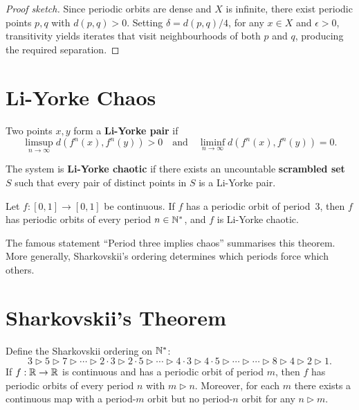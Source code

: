 \begin{proof}[Proof sketch]
Since periodic orbits are dense and $X$ is infinite, there exist periodic
points $p, q$ with $d(p, q) > 0$. Setting $\delta = d(p, q)/4$, for any
$x \in X$ and $\epsilon > 0$, transitivity yields iterates that visit
neighbourhoods of both $p$ and $q$, producing the required separation.
\end{proof}

\section{Li-Yorke Chaos}

\begin{definition}
Two points $x, y$ form a \textbf{Li-Yorke pair} if
\[
    \limsup_{n \to \infty} d(f^n(x), f^n(y)) > 0 \quad \text{and} \quad
    \liminf_{n \to \infty} d(f^n(x), f^n(y)) = 0.
\]
\end{definition}

\begin{definition}
The system is \textbf{Li-Yorke chaotic} if there exists an uncountable
\textbf{scrambled set} $S$ such that every pair of distinct points in $S$ is
a Li-Yorke pair.
\end{definition}

\begin{theorem}[Li-Yorke, 1975]
\label{thm:li-yorke}
Let $f : [0,1] \to [0,1]$ be continuous. If $f$ has a periodic orbit of
period~3, then $f$ has periodic orbits of every period $n \in \mathbb{N}^*$, and $f$
is Li-Yorke chaotic.
\end{theorem}

\begin{remark}
The famous statement ``Period three implies chaos'' summarises this theorem.
More generally, Sharkovskii's ordering determines which periods force which
others.
\end{remark}

\section{Sharkovskii's Theorem}

\begin{theorem}[Sharkovskii, 1964]
Define the Sharkovskii ordering on $\mathbb{N}^*$:
\[
    3 \triangleright 5 \triangleright 7 \triangleright \cdots \triangleright
    2\cdot 3 \triangleright 2\cdot 5 \triangleright \cdots \triangleright
    4\cdot 3 \triangleright 4\cdot 5 \triangleright \cdots \triangleright
    \cdots \triangleright 8 \triangleright 4 \triangleright 2 \triangleright 1.
\]
If $f : \mathbb{R} \to \mathbb{R}$ is continuous and has a periodic orbit of period $m$, then
$f$ has periodic orbits of every period $n$ with $m \triangleright n$.
Moreover, for each $m$ there exists a continuous map with a period-$m$ orbit
but no period-$n$ orbit for any $n \triangleright m$.
\end{theorem}

